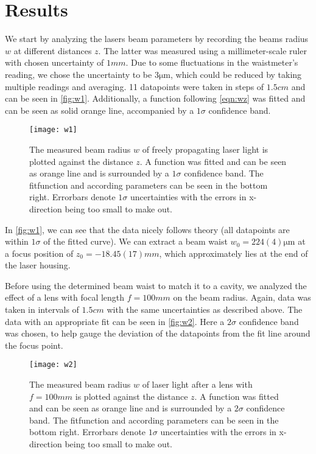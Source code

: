 \section{Results}
We start by analyzing the lasers beam parameters by recording the beams radius $w$ at different distances $z$. The latter was measured using a millimeter-scale ruler with chosen uncertainty of $1 \unit{mm}$. Due to some fluctuations in the waistmeter's reading, we chose the uncertainty to be $3 \unit{\micro\m}$, which could be reduced by taking multiple readings and averaging. 11 datapoints were taken in steps of $1.5 \unit{cm}$ and can be seen in \autoref{fig:w1}. Additionally, a function following \autoref{eqn:wz} was fitted and can be seen as solid orange line, accompanied by a $1\sigma$ confidence band. 

\begin{figure}[H]
	\centering
	\texttt{[image: w1]}
	\caption{The measured beam radius $w$ of freely propagating laser light is plotted against the distance $z$. A function was fitted and can be seen as orange line and is surrounded by a $1\sigma$ confidence band. The fitfunction and according parameters can be seen in the bottom right. Errorbars denote $1\sigma$ uncertainties with the errors in x-direction being too small to make out.}
	\label{fig:w1}
\end{figure}

In \autoref{fig:w1}, we can see that the data nicely follows theory (all datapoints are within $1\sigma$ of the fitted curve). We can extract a beam waist $w_0 = 224(4) \unit{\micro\m}$ at a focus position of $z_0 = -18.45(17) \unit{mm}$, which approximately lies at the end of the laser housing.

Before using the determined beam waist to match it to a cavity, we analyzed the effect of a lens with focal length $f = 100 \unit{mm}$ on the beam radius. Again, data was taken in intervals of $1.5 \unit{cm}$ with the same uncertainties as described above. The data with an appropriate fit can be seen in \autoref{fig:w2}. Here a $2\sigma$ confidence band was chosen, to help gauge the deviation of the datapoints from the fit line around the focus point.

\begin{figure}[H]
	\centering
	\texttt{[image: w2]}
	\caption{The measured beam radius $w$ of laser light after a lens with $f = 100 \unit{mm}$ is plotted against the distance $z$. A function was fitted and can be seen as orange line and is surrounded by a $2\sigma$ confidence band. The fitfunction and according parameters can be seen in the bottom right. Errorbars denote $1\sigma$ uncertainties with the errors in x-direction being too small to make out.}
	\label{fig:w2}
\end{figure}

